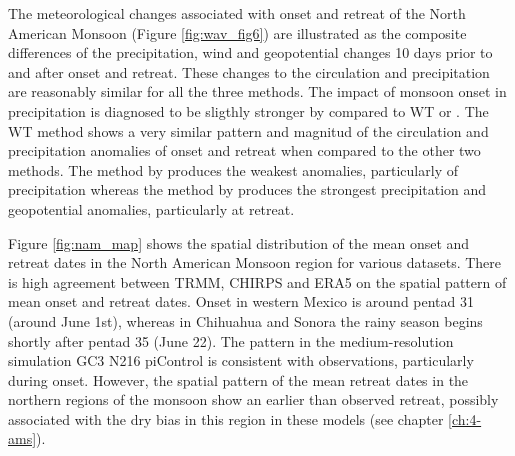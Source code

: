 The meteorological changes associated with onset and retreat of the North American Monsoon  (Figure \ref{fig:wav_fig6}) are illustrated as the composite differences of the precipitation, wind and geopotential changes 10 days prior to and after onset and retreat. These changes to the circulation and precipitation are reasonably similar for all the three methods. The impact of monsoon onset in precipitation is diagnosed to be sligthly stronger by  compared to WT or . 
The WT method shows a very similar pattern and magnitud of the circulation and precipitation anomalies of onset and retreat when compared to the other two methods. The method by  produces the weakest anomalies, particularly of precipitation whereas the method by  produces the strongest precipitation and geopotential anomalies, particularly at retreat.

Figure \ref{fig:nam_map} shows the spatial distribution of the mean onset and retreat dates in the North American Monsoon region for various datasets.
There is high agreement between TRMM, CHIRPS and ERA5 on the spatial pattern of mean onset and retreat dates.
Onset in western Mexico is around pentad 31 (around June 1st), whereas in Chihuahua and Sonora the rainy season begins shortly after pentad 35 (June 22).
The pattern in the medium-resolution simulation GC3 N216 piControl is consistent with observations, particularly during onset.  However, the spatial pattern of the mean retreat dates in the northern regions of the monsoon show an earlier than observed retreat, possibly associated with the dry bias in this region in these models (see chapter \ref{ch:4-ams}).

